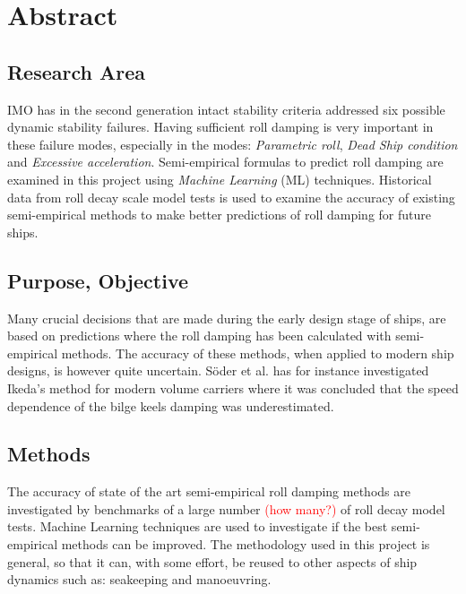 \section{Abstract}
\label{se:abstract}
\subsection{Research Area}
IMO has in the second generation intact stability criteria \cite{imo_second_nodate} addressed six possible dynamic stability failures. Having sufficient roll damping is very important in these failure modes, especially in the modes: \emph{Parametric roll}, \emph{Dead Ship condition} and \emph{Excessive acceleration}. Semi-empirical formulas to predict roll damping are examined in this project using \emph{Machine Learning} (ML) techniques. Historical data from roll decay scale model tests is used to examine the accuracy of existing semi-empirical methods to make better predictions of roll damping for future ships.
		
\subsection{Purpose, Objective}
Many crucial decisions that are made during the early design stage of ships, are based on predictions where the roll damping has been calculated with semi-empirical methods. The accuracy of these methods, when applied to modern ship designs, is however quite uncertain. Söder et al. \cite{soder_ikeda_2019} has for instance investigated Ikeda’s method for modern volume carriers where it was concluded that the speed dependence of the bilge keels damping was underestimated.

\subsection{Methods}
The accuracy of state of the art semi-empirical roll damping methods are investigated by benchmarks of a large number \textcolor{red}{(how many?)} of roll decay model tests. Machine Learning techniques are used to investigate if the best semi-empirical methods can be improved. The methodology used in this project is general, so that it can, with some effort, be reused to other aspects of ship dynamics such as: seakeeping and manoeuvring.

